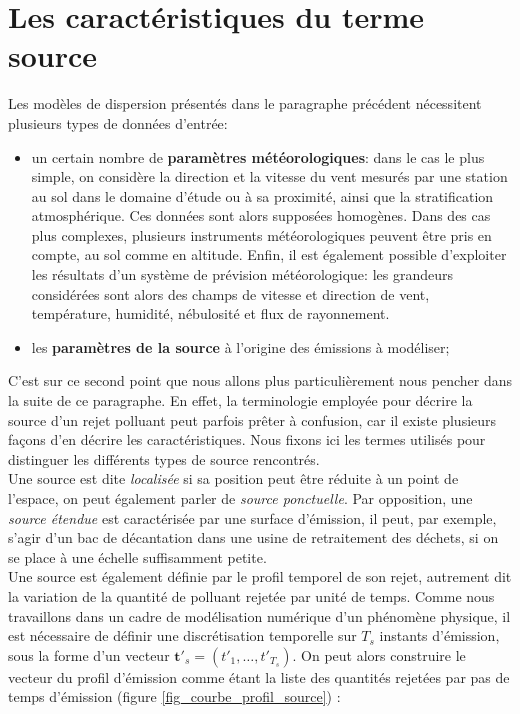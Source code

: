 	
	\section{Les caractéristiques du terme source}
	
	Les modèles de dispersion présentés dans le paragraphe précédent nécessitent plusieurs types de données d'entrée: 
	\begin{itemize}
		\item un certain nombre de \textbf{paramètres météorologiques}: dans le cas le plus simple, on considère la direction et la vitesse du vent mesurés par une station au sol dans le domaine d'étude ou à sa proximité, ainsi que la stratification atmosphérique. Ces données sont alors supposées homogènes. Dans des cas plus complexes, plusieurs instruments météorologiques peuvent être pris en compte, au sol comme en altitude. Enfin, il est également possible d'exploiter les résultats d'un système de prévision météorologique: les grandeurs considérées sont alors des champs de vitesse et direction de vent, température, humidité, nébulosité et flux de rayonnement.
		\item les \textbf{paramètres de la source} à l'origine des émissions à modéliser{;}
	\end{itemize}
	
	C'est sur ce second point que nous allons plus particulièrement nous pencher dans la suite de ce paragraphe. En effet, la terminologie employée pour décrire la source d'un rejet polluant peut parfois prêter à confusion, car il existe plusieurs façons d'en décrire les caractéristiques. Nous fixons ici les termes utilisés pour distinguer les différents types de source rencontrés.\\
	
	Une source est dite \textit{localisée} si sa position peut être réduite à un point de l'espace, on peut également parler de \textit{source ponctuelle}. Par opposition, une \textit{source étendue} est caractérisée par une surface d'émission, il peut, par exemple, s'agir d'un bac de décantation dans une usine de retraitement des déchets, si on se place à une échelle suffisamment petite.\\
	
	Une source est également définie par le profil temporel de son rejet, autrement dit la variation de la quantité de polluant rejetée par unité de temps. Comme nous travaillons dans un cadre de modélisation numérique d'un phénomène physique, il est nécessaire de définir une discrétisation temporelle sur $T_s$ instants d'émission, sous la forme d'un vecteur $\bm{t'}_s = (t'_1, \dots, t'_{T_s})$. On peut alors construire le vecteur du profil d'émission comme étant la liste des quantités rejetées par pas de temps d'émission (figure \ref{fig_courbe_profil_source}) : 
	
